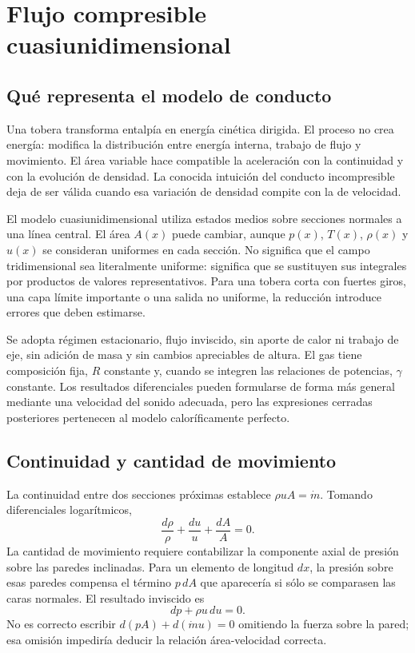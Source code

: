 \chapter{Flujo compresible cuasiunidimensional}\label{ch:05}
\section{Qué representa el modelo de conducto}
Una tobera transforma entalpía en energía cinética dirigida. El proceso no crea energía: modifica la distribución entre energía interna, trabajo de flujo y movimiento. El área variable hace compatible la aceleración con la continuidad y con la evolución de densidad. La conocida intuición del conducto incompresible deja de ser válida cuando esa variación de densidad compite con la de velocidad.

El modelo cuasiunidimensional utiliza estados medios sobre secciones normales a una línea central. El área $A(x)$ puede cambiar, aunque $p(x)$, $T(x)$, $\rho(x)$ y $u(x)$ se consideran uniformes en cada sección. No significa que el campo tridimensional sea literalmente uniforme: significa que se sustituyen sus integrales por productos de valores representativos. Para una tobera corta con fuertes giros, una capa límite importante o una salida no uniforme, la reducción introduce errores que deben estimarse.

Se adopta régimen estacionario, flujo inviscido, sin aporte de calor ni trabajo de eje, sin adición de masa y sin cambios apreciables de altura. El gas tiene composición fija, $R$ constante y, cuando se integren las relaciones de potencias, $\gamma$ constante. Los resultados diferenciales pueden formularse de forma más general mediante una velocidad del sonido adecuada, pero las expresiones cerradas posteriores pertenecen al modelo caloríficamente perfecto.\cite{MIT02,MIT03}
\section{Continuidad y cantidad de movimiento}
La continuidad entre dos secciones próximas establece $\rho u A=\dot m$. Tomando diferenciales logarítmicos,
\begin{equation}\label{eq:contdiff}
 \frac{d\rho}{\rho}+\frac{du}{u}+\frac{dA}{A}=0.
\end{equation}
La cantidad de movimiento requiere contabilizar la componente axial de presión sobre las paredes inclinadas. Para un elemento de longitud $dx$, la presión sobre esas paredes compensa el término $p\,dA$ que aparecería si sólo se comparasen las caras normales. El resultado inviscido es
\begin{equation}\label{eq:momentdiff}
 dp+\rho u\,du=0.
\end{equation}
No es correcto escribir $d(pA)+d(\dot m u)=0$ omitiendo la fuerza sobre la pared; esa omisión impediría deducir la relación área-velocidad correcta.

